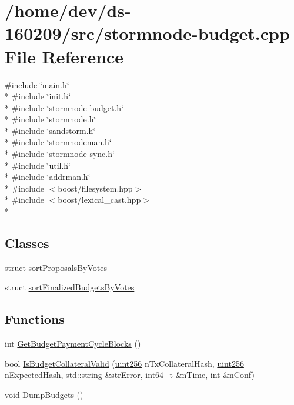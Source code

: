 \hypertarget{stormnode-budget_8cpp}{}\section{/home/dev/ds-\/160209/src/stormnode-\/budget.cpp File Reference}
\label{stormnode-budget_8cpp}
{\ttfamily \#include \char`\"{}main.\+h\char`\"{}}\\*
{\ttfamily \#include \char`\"{}init.\+h\char`\"{}}\\*
{\ttfamily \#include \char`\"{}stormnode-\/budget.\+h\char`\"{}}\\*
{\ttfamily \#include \char`\"{}stormnode.\+h\char`\"{}}\\*
{\ttfamily \#include \char`\"{}sandstorm.\+h\char`\"{}}\\*
{\ttfamily \#include \char`\"{}stormnodeman.\+h\char`\"{}}\\*
{\ttfamily \#include \char`\"{}stormnode-\/sync.\+h\char`\"{}}\\*
{\ttfamily \#include \char`\"{}util.\+h\char`\"{}}\\*
{\ttfamily \#include \char`\"{}addrman.\+h\char`\"{}}\\*
{\ttfamily \#include $<$boost/filesystem.\+hpp$>$}\\*
{\ttfamily \#include $<$boost/lexical\+\_\+cast.\+hpp$>$}\\*
\subsection*{Classes}
\begin{DoxyCompactItemize}
\item 
struct \hyperlink{structsort_proposals_by_votes}{sort\+Proposals\+By\+Votes}
\item 
struct \hyperlink{structsort_finalized_budgets_by_votes}{sort\+Finalized\+Budgets\+By\+Votes}
\end{DoxyCompactItemize}
\subsection*{Functions}
\begin{DoxyCompactItemize}
\item 
int \hyperlink{stormnode-budget_8cpp_a25f51a3a63c2bdfca39a2c9a7f110ab1}{Get\+Budget\+Payment\+Cycle\+Blocks} ()
\item 
bool \hyperlink{stormnode-budget_8cpp_af987fefd1417be5dcd356634986dbf83}{Is\+Budget\+Collateral\+Valid} (\hyperlink{classuint256}{uint256} n\+Tx\+Collateral\+Hash, \hyperlink{classuint256}{uint256} n\+Expected\+Hash, std\+::string \&str\+Error, \hyperlink{stdint_8h_adec1df1b8b51cb32b77e5b86fff46471}{int64\+\_\+t} \&n\+Time, int \&n\+Conf)
\item 
void \hyperlink{stormnode-budget_8cpp_a277f8d83f6cfcfbe4ee3f622d38f8790}{Dump\+Budgets} ()
\end{DoxyCompactItemize}
